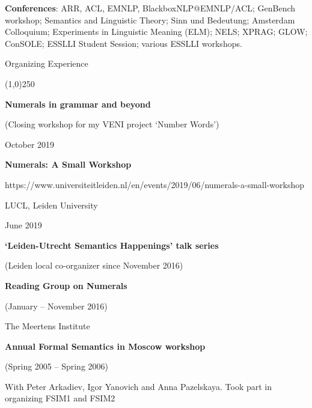 \documentclass[12pt,letterpaper]{article}
\begin{document}
{{\begin{hangparas}{.89in}{1}
\textbf{Conferences}: ARR, ACL, EMNLP, BlackboxNLP@EMNLP/ACL; GenBench workshop; Semantics and Linguistic Theory; Sinn und Bedeutung; Amsterdam Colloquium; Experiments in Linguistic Meaning (ELM); NELS; XPRAG; GLOW; ConSOLE; ESSLLI Student Session; various ESSLLI workshops.

\end{hangparas}
}

\vspace{5mm}

\noindent \Large{Organizing Experience}

\vspace{-4mm}
\noindent\line(1,0){250}

\vspace{2mm}

\small{
\noindent\textbf{Numerals in grammar and beyond}

(Closing workshop for my VENI project `Number Words')

October 2019}


\vspace{2mm}

\small{
\noindent\textbf{Numerals: A Small Workshop}

https://www.universiteitleiden.nl/en/events/2019/06/numerals-a-small-workshop

LUCL, Leiden University

June 2019}

\vspace{2mm}

\small{
\noindent\textbf{`Leiden-Utrecht Semantics Happenings' talk series}

(Leiden local co-organizer since November 2016)}

\vspace{2mm}

\small{
\noindent\textbf{Reading Group on Numerals}

(January -- November 2016)

The Meertens Institute}

\vspace{2mm}

\small{
\noindent\textbf{Annual Formal Semantics in Moscow workshop}

(Spring 2005 -- Spring 2006)

With Peter Arkadiev, Igor Yanovich and Anna Pazelskaya. 
Took part in organizing FSIM1 and FSIM2 }

\vspace{2mm}

}
\end{document}
